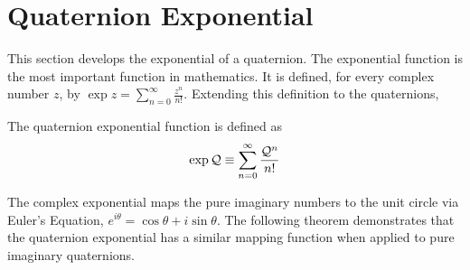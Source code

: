 \section{Quaternion Exponential}\label{sec:app_exp}

This section develops the exponential of a quaternion.
The exponential function is the most important function in mathematics.
It is defined, for every complex number $z$,
by $\exp z = \sum_{n=0}^\infty \frac{z^n}{n!}$.
Extending this definition to the quaternions,
\begin{definition}\label{def:quat_exp}
The quaternion exponential function is defined as
\begin{equation}
\exp \mathcal{Q} \equiv \sum_{n=0}^\infty \frac{\mathcal{Q}^n}{n!}\label{eqn:quat_expq}
\end{equation}
\end{definition}

The complex exponential maps the pure imaginary numbers to the unit circle via
Euler's Equation, $e^{i\theta} = \cos \theta + i \sin \theta$.
The following theorem demonstrates that the quaternion exponential
has a similar mapping function when applied to pure imaginary quaternions.

